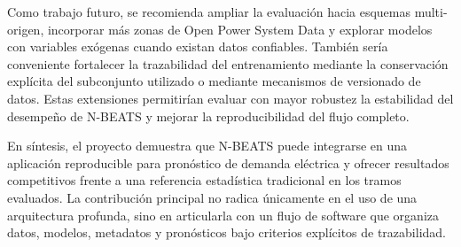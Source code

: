 Como trabajo futuro, se recomienda ampliar la evaluación hacia esquemas multi-origen, incorporar más zonas de Open Power System Data y explorar modelos con variables exógenas cuando existan datos confiables. También sería conveniente fortalecer la trazabilidad del entrenamiento mediante la conservación explícita del subconjunto utilizado o mediante mecanismos de versionado de datos. Estas extensiones permitirían evaluar con mayor robustez la estabilidad del desempeño de N-BEATS y mejorar la reproducibilidad del flujo completo.

En síntesis, el proyecto demuestra que N-BEATS puede integrarse en una aplicación reproducible para pronóstico de demanda eléctrica y ofrecer resultados competitivos frente a una referencia estadística tradicional en los tramos evaluados. La contribución principal no radica únicamente en el uso de una arquitectura profunda, sino en articularla con un flujo de software que organiza datos, modelos, metadatos y pronósticos bajo criterios explícitos de trazabilidad.
